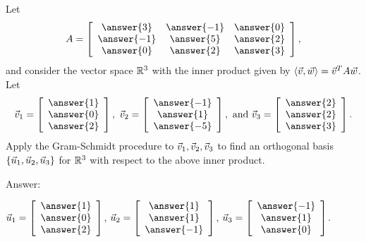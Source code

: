 \documentclass{ximera}
\begin{document}
\begin{problem}
  Let
  \begin{equation*}
    A = \startmat{ccc}
      \answer{3} & \answer{-1} & \answer{0} \\
      \answer{-1} & \answer{5} & \answer{2} \\
      \answer{0} & \answer{2} & \answer{3} \\
    \stopmat,
  \end{equation*}
  and consider the vector space $\mathbb{R}^3$ with the inner product given by
  $\langle \vec{v},\vec{w} \rangle = \vec{v}^T A\vec{w}$.
  Let
  \begin{equation*}
    \vect{v}_1 = \startmat{c} \answer{1} \\ \answer{0} \\ \answer{2} \stopmat,
    \quad
    \vect{v}_2 = \startmat{c} \answer{-1} \\ \answer{1} \\ \answer{-5} \stopmat,
    \quad\mbox{and}\quad
    \vect{v}_3 = \startmat{c} \answer{2} \\ \answer{2} \\ \answer{3} \stopmat.
  \end{equation*}
  Apply the Gram-Schmidt procedure to
  $\vec{v}_1,\vec{v}_2,\vec{v}_3$ to find an orthogonal basis
  $\left\{\vec{u}_1,\vec{u}_2,\vec{u}_3\right\}$ for $\mathbb{R}^3$ with respect to
  the above inner product.

  Answer:

    $\vect{u}_1 = \startmat{c} \answer{1} \\ \answer{0} \\ \answer{2} \stopmat$,
    $\vect{u}_2 = \startmat{c} \answer{1} \\ \answer{1} \\ \answer{-1} \stopmat$,
    $\vect{u}_3 = \startmat{c} \answer{-1} \\ \answer{1} \\ \answer{0} \stopmat$.

\end{problem}
\end{document}
